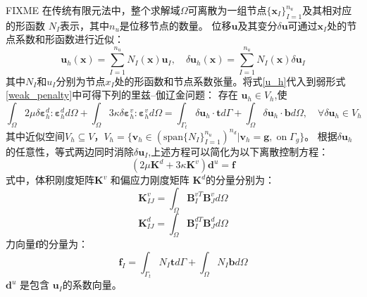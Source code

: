 FIXME
在传统有限元法中，整个求解域$\Omega$可离散为一组节点$\{\boldsymbol x_I\}_{I=1}^{n_u}$及其相对应的形函数 $N_I$表示\cite{hughes2000}，其中$n_u$是位移节点的数量。
位移$\boldsymbol u$及其变分$\delta \boldsymbol u $可通过$\boldsymbol x_I$处的节点系数和形函数进行近似：
\begin{equation}\label{u_h}
    \boldsymbol u_h(\boldsymbol x) = \sum_{I=1}^{n_u} N_I(\boldsymbol x) \boldsymbol u_I, \quad
    \delta \boldsymbol u_h(\boldsymbol x) = \sum_{I=1}^{n_u} N_I(\boldsymbol x) \delta \boldsymbol u_I
\end{equation}
其中$N_I$和$u_I$分别为节点$x_I$处的形函数和节点系数张量。将式\eqref{u_h}代入到弱形式\eqref{weak_penalty}中可得下列的里兹--伽辽金问题：
存在 $\boldsymbol u_h \in V_h$,使
\begin{equation}\label{ritz_penalty}
\int_\Omega 2\mu \delta \boldsymbol \varepsilon^d_h : \boldsymbol \varepsilon^d_h d\Omega +
\int_\Omega 3\kappa \delta \boldsymbol \varepsilon^v_h : \boldsymbol \varepsilon^v_h d\Omega =
\int_{\Gamma_t} \delta \boldsymbol u_h \cdot \boldsymbol t d\Gamma + \int_\Omega \delta \boldsymbol u_h \cdot \boldsymbol b d\Omega, \quad
\forall \delta \boldsymbol u_h \in V_h
\end{equation}
其中近似空间$V_h \subseteq V$，$V_h = \{\boldsymbol v_h \in (\mathrm{span}\{N_I\}_{I=1}^{n_u})^{n_d} \vert \boldsymbol v_h = \boldsymbol g,\; \mathrm{on} \; \Gamma_g\}$。
根据$\delta \boldsymbol u_h$的任意性，等式两边同时消除$\delta \boldsymbol u_I$,上述方程可以简化为以下离散控制方程：
\begin{equation}\label{equilibrium_penalty}
    (2\mu\boldsymbol K^d + 3\kappa\boldsymbol K^v) \boldsymbol d^u = \boldsymbol f
\end{equation}
式中，体积刚度矩阵$\boldsymbol K^v$ 和偏应力刚度矩阵 $\boldsymbol K^d$的分量分别为：
\begin{equation}\label{stiffness_vol}
    \boldsymbol K^v_{IJ}= \int_{\Omega} \boldsymbol B^{vT}_I \boldsymbol B^v_J d\Omega
\end{equation}
\begin{equation}\label{stiffness_dev}
    \boldsymbol K^d_{IJ}= \int_{\Omega} \boldsymbol B^{dT}_I \boldsymbol B^d_J d\Omega
\end{equation}
力向量$\boldsymbol f$的分量为：
\begin{equation}
    \boldsymbol f_I = \int_{\Gamma_t} N_I \boldsymbol t d\Gamma + \int_{\Omega} N_I \boldsymbol b d\Omega
\end{equation}
$\boldsymbol d^u$ 是包含 $\boldsymbol u_I$的系数向量。

